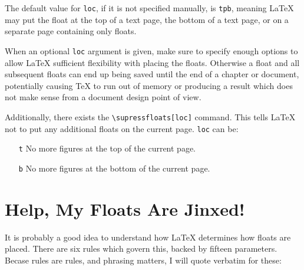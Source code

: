 \documentclass[article,a4paper,oneside,10pt]{memoir}
\newcommand\code[1]{\texttt{#1}}
\begin{document}
The  default  value for  \code{loc},  if  it  is  not specified  manually,  is
\code{tpb}, meaning \LaTeX{} may put the float  at the top of a text page, the
bottom of a text page, or on a separate page containing only floats.

When  an  optional  \code{loc}  argument   is  given,  make  sure  to  specify
enough  options to  allow  \LaTeX{} sufficient  flexibility  with placing  the
floats. Otherwise a  float and all  subsequent floats  can end up  being saved
until the end of a chapter or  document, potentially causing \TeX{} to run out
of memory  or producing  a result which  does not make  sense from  a document
design point of view.


Additionally, there exists  the \verb|\supressfloats[loc]| command. This tells
\LaTeX{} not to put any additional  floats on the current page. \code{loc} can
be:

\begin{itemize}
    \item [\code{t}] No more figures at the top of the current page.
    \item [\code{b}] No more figures at the bottom of the current page.
\end{itemize}


\chapter{Help, My Floats Are Jinxed!}
\label{chap:jinxed}

It is  probably a good idea  to understand how \LaTeX{}  determines how floats
are  placed. There  are  six  rules  which  govern  this,  backed  by  fifteen
parameters.   Becase rules  are  rules,  and phrasing  matters,  I will  quote
\cite{lamport} verbatim for these:
\end{document}
